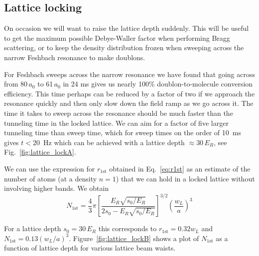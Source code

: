 \documentclass[11pt,letter]{article}
\begin{document}
\subsection{Lattice locking}
\label{subsec:locking}

On occasion we will want to raise the lattice depth suddenly. This will be
useful to get the maximum possible Debye-Waller factor when performing Bragg
scattering,  or to keep the density distribution frozen when sweeping across
the narrow Feshbach resonance to make doublons.   

For Feshbach sweeps across the narrow resonance we have found that going across
from 80\,$a_{0}$ to 61\,$a_{0}$ in 24 ms gives us nearly 100\%
doublon-to-molecule conversion efficiency.  This time perhaps can be reduced by
a factor of two if we approach the resonance quickly and then only slow down
the field ramp as we go across it.   The time it takes to sweep across the
resonance should be much faster than the tunneling time in the locked lattice.
We can aim for a factor of five larger tunneling time than sweep time, which
for sweep times on the order of 10~ms gives $t<20$~Hz which can be achieved
with a lattice depth $\approx 30\,E_{R}$, see Fig.~\ref{fig:lattice_lockA}.  

We can use the expression for $r_{1\text{st}}$ obtained in Eq.~\ref{eq:r1st} as
an estimate of the number of atoms (at a density $n=1$) that we can hold in a
locked lattice without involving higher bands.  We obtain
\begin{equation} 
 N_{1\text{st}} =  \frac{4}{3}\pi \left[ \frac{E_{R}\sqrt{s_{0}/E_{R}}}
                              {2s_{0}-E_{R}\sqrt{s_{0}/E_{R}}}  \right]^{3/2} 
                     \left( \frac{w_{L}}{a} \right)^{3} 
\end{equation}

For a lattice depth $s_{0}=30\,E_{R}$  this corresponds to $r_{1\text{st}} =
0.32 w_{L}$ and $N_{1\text{st}} = 0.13 (w_{L}/a)^{3}$.
Figure~\ref{fig:lattice_lockB} shows a plot of $N_{1\text{st}}$ as a function
of lattice depth for various lattice beam waists.  
\end{document}
